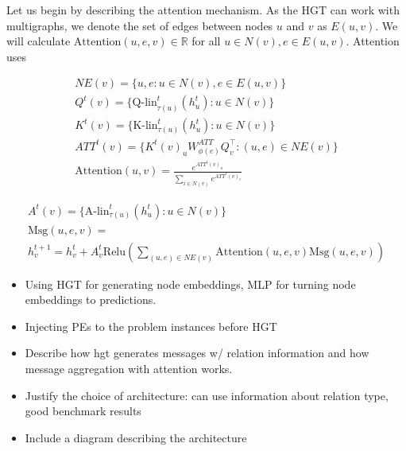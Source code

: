 \documentclass[english, 12pt, a4paper, sci, utf8, a-2b, online]{aaltothesis}
\newcommand{\R}{\mathbb{R}}
\newcommand{\Klin}{\textrm{K-lin}}
\newcommand{\Qlin}{\textrm{Q-lin}}
\newcommand{\Alin}{\textrm{A-lin}}
\newcommand{\msg}{\textrm{Msg}}
\begin{document}
Let us begin by describing the attention mechanism. As the HGT can work with multigraphs, we denote the set of edges between nodes $u$ and $v$ as $E(u,v)$. We will calculate $\text{Attention}(u, e, v) \in \R$ for all $u \in N(v), e \in E(u,v)$. Attention uses

\begin{align}
    NE(v) = \{u, e : u \in N(v), e \in E(u, v)\}\\
    Q^t(v) = \{\Qlin^t_{\tau(u)}(h^t_u): u \in N(v)\} \\
    K^t(v) = \{\Klin^t_{\tau(u)}(h^t_u): u \in N(v)\}\\
    ATT^t(v) = \{K^t(v)_uW^{ATT}_{\phi(e)}Q^\top_v : (u, e) \in NE(v) \} \\
    \text{Attention}(u, v) = \frac{e^{ATT^t(v)_u}}{\sum_{i \in N(v)} e^{ATT^t(v)_i}} 
\end{align}


\begin{align}
    A^t(v) = \{\Alin^t_{\tau(u)}(h^t_u): u \in N(v)\} \\
    \msg(u, e, v) = \\
    h^{t+1}_v = h^t_v + A^t_v \text{Relu}\left(\sum_{(u, e) \in NE(v)} \text{Attention}(u, e, v) \msg(u, e, v)\right)
\end{align}


\begin{itemize}
    \item Using HGT for generating node embeddings, MLP for turning node embeddings to predictions.
    \item Injecting PEs to the problem instances before HGT
    \item Describe how hgt generates messages w/ relation information and how message aggregation with attention works.
    \item Justify the choice of architecture: can use information about relation type, good benchmark results
    \item Include a diagram describing the architecture
\end{itemize}
\end{document}
